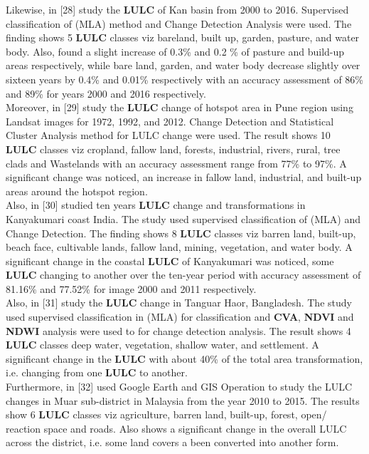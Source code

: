 \documentclass[10pt]{report}
\begin{document}
\begin{flushleft}
		Likewise, in [28] study the \textbf{LULC} of Kan basin from 2000 to 2016.	Supervised classification of (MLA) method and Change Detection	Analysis were used. The finding shows 5 \textbf{LULC} classes viz bareland, built up, garden, pasture, and water body. Also, found a	slight increase of 0.3\% and 0.2 \% of pasture and build-up areas	respectively, while bare land, garden, and water body decrease	slightly over sixteen years by 0.4\% and 0.01\% respectively with	an accuracy assessment of 86\% and 89\% for years 2000 and 2016	respectively.\\
		
		Moreover, in [29] study the \textbf{LULC} change of hotspot area in Pune	region using Landsat images for 1972, 1992, and 2012. Change	Detection and Statistical Cluster Analysis method for LULC	change were used. The result shows 10 \textbf{LULC} classes viz cropland,	fallow land, forests, industrial, rivers, rural, tree clads and Wastelands with an accuracy assessment range from 77\% to 97\%. A	significant change was noticed, an increase in fallow land, industrial, and built-up areas around the hotspot region.\\
		
		Also, in [30] studied ten years \textbf{LULC} change and transformations
		in Kanyakumari coast India. The study used supervised classification of (MLA) and Change Detection. The finding shows 8 \textbf{LULC} classes viz barren land, built-up, beach face, cultivable lands, fallow land, mining, vegetation, and water body. A significant	change in the coastal \textbf{LULC} of Kanyakumari was noticed, some	\textbf{LULC} changing to another over the ten-year period with accuracy	assessment of 81.16\% and 77.52\% for image 2000 and 2011 respectively.\\
		
		Also, in [31] study the \textbf{LULC} change in Tanguar Haor, Bangladesh. The study used supervised classification in (MLA) for classification and \textbf{CVA}, \textbf{NDVI} and \textbf{NDWI} analysis were used to for	change detection analysis. The result shows 4 \textbf{LULC} classes deep water, vegetation, shallow water, and settlement. A significant change in the \textbf{LULC} with about 40\% of the total area transformation, i.e. changing from one \textbf{LULC} to another.\\
		
		Furthermore, in [32] used Google Earth and GIS Operation to	study the LULC changes in Muar sub-district in Malaysia from
		the year 2010 to 2015. The results show 6 \textbf{LULC} classes viz agriculture, barren land, built-up, forest, open/ reaction space and	roads. Also shows a significant change in the overall LULC across	the district, i.e. some land covers a been converted into another	form.\\
		

\end{flushleft}
\end{document}
